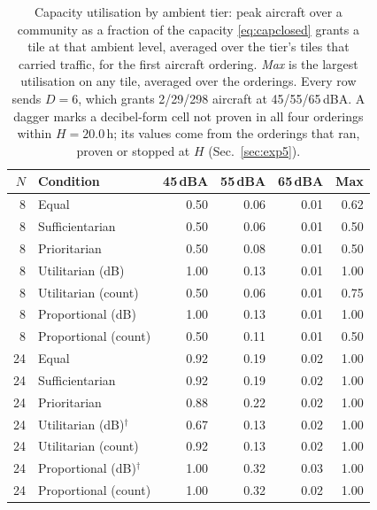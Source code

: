 \begin{table}[t]
\centering
\caption{Capacity utilisation by ambient tier: peak aircraft over a community as a fraction of the capacity \eqref{eq:capclosed} grants a tile at that ambient level, averaged over the tier's tiles that carried traffic, for the first aircraft ordering. \emph{Max} is the largest utilisation on any tile, averaged over the orderings. Every row sends $D{=}6$, which grants 2/29/298 aircraft at 45/55/65\,dBA. A dagger marks a decibel-form cell not proven in all four orderings within $H=20.0$\,h; its values come from the orderings that ran, proven or stopped at $H$ (Sec.~\ref{sec:exp5}).}
\label{tab:capacity}
\footnotesize
\setlength{\tabcolsep}{4pt}
\begin{tabular}{r l rrr r}
\toprule
$N$ & Condition & 45\,dBA & 55\,dBA & 65\,dBA & Max \\
\midrule
8 & Equal & 0.50 & 0.06 & 0.01 & 0.62 \\
8 & Sufficientarian & 0.50 & 0.06 & 0.01 & 0.50 \\
8 & Prioritarian & 0.50 & 0.08 & 0.01 & 0.50 \\
8 & Utilitarian (dB) & 1.00 & 0.13 & 0.01 & 1.00 \\
8 & Utilitarian (count) & 0.50 & 0.06 & 0.01 & 0.75 \\
8 & Proportional (dB) & 1.00 & 0.13 & 0.01 & 1.00 \\
8 & Proportional (count) & 0.50 & 0.11 & 0.01 & 0.50 \\
\midrule
24 & Equal & 0.92 & 0.19 & 0.02 & 1.00 \\
24 & Sufficientarian & 0.92 & 0.19 & 0.02 & 1.00 \\
24 & Prioritarian & 0.88 & 0.22 & 0.02 & 1.00 \\
24 & Utilitarian (dB)$^\dagger$ & 0.67 & 0.13 & 0.02 & 1.00 \\
24 & Utilitarian (count) & 0.92 & 0.13 & 0.02 & 1.00 \\
24 & Proportional (dB)$^\dagger$ & 1.00 & 0.32 & 0.03 & 1.00 \\
24 & Proportional (count) & 1.00 & 0.32 & 0.02 & 1.00 \\
\bottomrule
\end{tabular}
\end{table}

